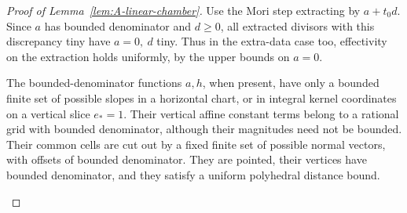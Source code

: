 \begin{proof}[Proof of Lemma~\ref{lem:A-linear-chamber}] Use the Mori step extracting by \(a+t_0d\).
Since \(a\) has bounded denominator and \(d\ge0\), all extracted divisors with this discrepancy tiny have \(a=0,\ d\) tiny.
Thus in the extra-data case too, effectivity on the extraction holds uniformly, by the upper bounds on \(a=0\).

\begin{claim}\label{claim:A-quantized-cells}
The bounded-denominator functions \(a,h\), when present, have only a
bounded finite set of possible slopes in a horizontal chart, or in
integral kernel coordinates on a vertical slice \(e_*=1\).
Their vertical affine constant terms belong to a rational grid with
bounded denominator, although their magnitudes need not be bounded.
Their common cells are cut out by a fixed finite set of possible
normal vectors, with offsets of bounded denominator.  They are
pointed, their vertices have bounded denominator, and they satisfy a
uniform polyhedral distance bound.
\end{claim}


\end{proof}
